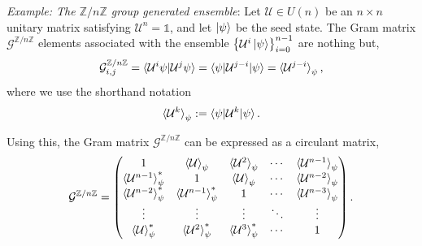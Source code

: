 \documentclass[12pt,letterpaper]{article}
\begin{document}
\begin{multicols}{2}
\emph{Example: The $\mathbb{Z}/n\mathbb{Z}$ group generated ensemble}: Let $\mathcal{U} \in U(n)$ be an $n \times n$ unitary matrix satisfying $\mathcal{U}^n = \mathds{1}$, and let $\ket{\psi}$ be the seed state. The Gram matrix $\mathcal{G}^{\mathbb{Z}/n\mathbb{Z}}$ elements associated with the ensemble $\left\{\mathcal{U}^i\ket{\psi}\right\}_{i=0}^{n-1}$ are nothing but,
\begin{align*}
	\mathcal{G}^{\mathbb{Z}/n\mathbb{Z}}_{i,j} = \braket{\mathcal{U}^i\psi | \mathcal{U}^j\psi} = \braket{\psi | \mathcal{U}^{j-i} | \psi} = \braket{\mathcal{U}^{j-i}}_{\psi},
\end{align*}
where we use the shorthand notation
\begin{align*}
	\braket{\mathcal{U}^k}_\psi := \braket{\psi | \mathcal{U}^k | \psi}.
\end{align*}

Using this, the Gram matrix $\mathcal{G}^{\mathbb{Z}/n\mathbb{Z}}$ can be expressed as a circulant matrix,
\begin{align*}
	\mathcal{G}^{\mathbb{Z}/n\mathbb{Z}} = \begin{pmatrix}
 1 & \braket{\mathcal{U}}_{\psi} & \braket{\mathcal{U}^2}_{\psi} & \cdots & \braket{\mathcal{U}^{n-1}}_{\psi} \\
 \braket{\mathcal{U}^{n-1}}_{\psi}^* & 1 & \braket{\mathcal{U}}_{\psi} & \cdots & \braket{\mathcal{U}^{n-2}}_{\psi} \\
 \braket{\mathcal{U}^{n-2}}_{\psi}^* & \braket{\mathcal{U}^{n-1}}_{\psi}^* & 1 & \cdots & \braket{\mathcal{U}^{n-3}}_{\psi} \\
 \vdots & \vdots & \vdots & \ddots & \vdots \\
 \braket{\mathcal{U}}_{\psi}^* & \braket{\mathcal{U}^{2}}_{\psi}^* & \braket{\mathcal{U}^{3}}_{\psi}^* & \cdots & 1
\end{pmatrix}.
\end{align*}


\end{multicols}
\end{document}
